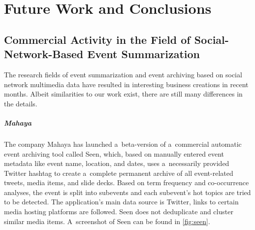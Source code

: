 

\chapter{Future Work and Conclusions}

\ifpdf
    \graphicspath{{11_future_work_and_conclusions/figures/PNG/}{11_future_work_and_conclusions/figures/PDF/}{11_future_work_and_conclusions/figures/}}
\else
    \graphicspath{{11_future_work_and_conclusions/figures/EPS/}{11_future_work_and_conclusions/figures/}}
\fi


\section{Commercial Activity in the Field of Social-Network-Based Event Summarization}

The research fields of event summarization and event archiving
based on social network multimedia data have resulted in 
interesting business creations in recent months.
Albeit similarities to our work exist,
there are still many differences in the details.

\paragraph{Mahaya}
 
The company Mahaya has launched a~beta-version
of a~commercial automatic event archiving tool called Seen,
which, based on manually entered event metadata like event name,
location, and dates, uses a~necessarily provided Twitter hashtag
to create a~complete permanent archive of all event-related tweets,
media items, and slide decks.
Based on term frequency and co-occurrence analyses,
the event is split into subevents
and each subevent's hot topics are tried to be detected.
The application's main data source is Twitter,
links to certain media hosting platforms are followed.
Seen does not deduplicate and cluster
similar media items.
A~screenshot of Seen can be found in \autoref{fig:seen}.

